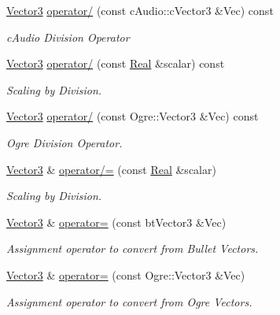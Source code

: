 \begin{DoxyCompactItemize}
\hyperlink{classMezzanine_1_1Vector3}{Vector3} \hyperlink{classMezzanine_1_1Vector3_a2a7b3c5d709832b532b2259e87a42efe}{operator/} (const cAudio::cVector3 \&Vec) const 
\begin{DoxyCompactList}\small\item\em cAudio Division Operator \item\end{DoxyCompactList}\item 
\hyperlink{classMezzanine_1_1Vector3}{Vector3} \hyperlink{classMezzanine_1_1Vector3_a35627082486d972f282597c49eb75692}{operator/} (const \hyperlink{namespaceMezzanine_a726731b1a7df72bf3583e4a97282c6f6}{Real} \&scalar) const 
\begin{DoxyCompactList}\small\item\em Scaling by Division. \item\end{DoxyCompactList}\item 
\hyperlink{classMezzanine_1_1Vector3}{Vector3} \hyperlink{classMezzanine_1_1Vector3_a71faa730673d00224c8f8a3f994dbf79}{operator/} (const Ogre::Vector3 \&Vec) const 
\begin{DoxyCompactList}\small\item\em Ogre Division Operator. \item\end{DoxyCompactList}\item 
\hyperlink{classMezzanine_1_1Vector3}{Vector3} \& \hyperlink{classMezzanine_1_1Vector3_a802c948d8fe307bc90b9debedd8fb764}{operator/=} (const \hyperlink{namespaceMezzanine_a726731b1a7df72bf3583e4a97282c6f6}{Real} \&scalar)
\begin{DoxyCompactList}\small\item\em Scaling by Division. \item\end{DoxyCompactList}\item 
\hyperlink{classMezzanine_1_1Vector3}{Vector3} \& \hyperlink{classMezzanine_1_1Vector3_a3d9ad7ab10c631d23a7ded2e791de900}{operator=} (const btVector3 \&Vec)
\begin{DoxyCompactList}\small\item\em Assignment operator to convert from Bullet Vectors. \item\end{DoxyCompactList}\item 
\hyperlink{classMezzanine_1_1Vector3}{Vector3} \& \hyperlink{classMezzanine_1_1Vector3_aa5f656c70691a0341ea7b25e70fcde90}{operator=} (const Ogre::Vector3 \&Vec)
\begin{DoxyCompactList}\small\item\em Assignment operator to convert from Ogre Vectors. \item\end{DoxyCompactList}\item 

\end{DoxyCompactItemize}
